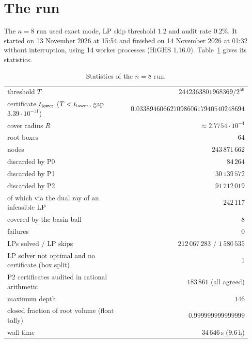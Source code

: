 \documentclass[11pt]{amsart}
\theoremstyle{definition}
\begin{document}
\section{The run}\label{sec:run}

The $n = 8$ run used exact mode, LP skip threshold $1.2$ and audit rate $0.2\%$. It started on 13 November 2026 at 15:54 and finished on 14 November 2026 at 01:32 without interruption, using 14 worker processes (HiGHS 1.16.0). Table~\ref{tab:run} gives its statistics. %

\begin{table}[htbp]
\centering\small
\caption{Statistics of the $n = 8$ run.}\label{tab:run}
\begin{tabular}{@{}lr@{}}
\toprule
threshold $T$ & $2442363801968369/2^{56}$ \\
certificate $t_{\rm lower}$ ($T < t_{\rm lower}$, gap $3.39\cdot10^{-11}$) & $0.03389460662709860617940540248694$ \\
cover radius $R$ & $\approx 2.7754\cdot10^{-4}$ \\
root boxes & $64$ \\
nodes & $243\,871\,662$ \\
\quad discarded by P0 & $84\,264$ \\
\quad discarded by P1 & $30\,139\,572$ \\
\quad discarded by P2 & $91\,712\,019$ \\
\quad\quad of which via the dual ray of an infeasible LP & $242\,117$ \\
\quad covered by the basin ball & $8$ \\
\quad failures & $0$ \\
LPs solved / LP skips & $212\,067\,283$ / $1\,580\,535$ \\
LP solver not optimal and no certificate (box split) & $1$ \\
P2 certificates audited in rational arithmetic & $183\,861$ (all agreed) \\
maximum depth & $146$ \\
closed fraction of root volume (float tally) & $0.999999999999999$ \\
wall time & $34\,646$\,s ($9.6$\,h) \\
\bottomrule
\end{tabular}
\end{table}
\end{document}
